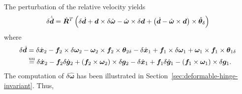 \documentclass[10pt,fleqn,subeqn]{report}
\newcommand{\T}[1]{\bm{#1}}
\newcommand{\TT}[1]{\bm{#1}}
\newcommand{\equu}{\overset{\text{uu}}{=}}
\begin{document}
The perturbation of the relative velocity yields
\begin{equation}
	\delta\dot{\tilde{\T{d}}} = \hat{\TT{R}}^T \plbr{
		\delta\dot{\T{d}}
		+ \T{d} \times \delta\hat{\T{\omega}}
		- \hat{\T{\omega}} \times \delta\T{d}
		+ \plbr{\dot{\T{d}} - \hat{\T{\omega}} \times \T{d}} \times \hat{\T{\theta}}_{\delta}
	}
\end{equation}
where
\begin{align}
	\delta\dot{\T{d}}
	&=
	\delta\dot{\T{x}}_2
	- \T{f}_2 \times \delta\T{\omega}_{2}
	- \T{\omega}_{2} \times \T{f}_2 \times \T{\theta}_{2\delta}
	- \delta\dot{\T{x}}_1
	+ \T{f}_1 \times \delta\T{\omega}_{1}
	+ \T{\omega}_{1} \times \T{f}_1 \times \T{\theta}_{1\delta}
	\nonumber \\
	&\equu
	\delta\dot{\T{x}}_2
	- \T{f}_2 \delta\dot{\T{g}}_2
	+ \plbr{\T{f}_2\times\T{\omega}_2}\times\delta\T{g}_2
	- \delta\dot{\T{x}}_1
	+ \T{f}_1 \delta\dot{\T{g}}_1
	- \plbr{\T{f}_1\times\T{\omega}_1}\times\delta\T{g}_1
	.
\end{align}
The computation of $\delta\hat{\T{\omega}}$ has been illustrated
in Section~\ref{sec:deformable-hinge-invariant}.
Thus,
\end{document}
